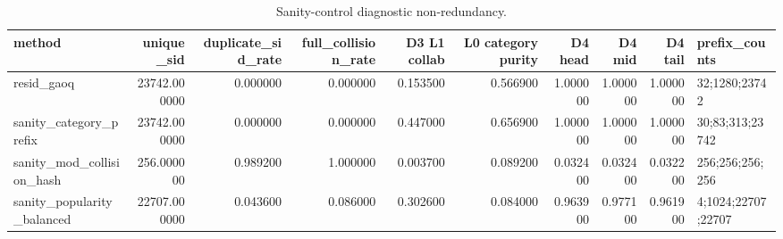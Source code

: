 \begin{table}
\caption{Sanity-control diagnostic non-redundancy.}
\label{tab:sanity-controls}
\begin{tabular}{lrrrrrrrrl}
\toprule
method & unique\_sid & duplicate\_sid\_rate & full\_collision\_rate & D3 L1 collab & L0 category purity & D4 head & D4 mid & D4 tail & prefix\_counts \\
\midrule
resid\_gaoq & 23742.000000 & 0.000000 & 0.000000 & 0.153500 & 0.566900 & 1.000000 & 1.000000 & 1.000000 & 32;1280;23742 \\
sanity\_category\_prefix & 23742.000000 & 0.000000 & 0.000000 & 0.447000 & 0.656900 & 1.000000 & 1.000000 & 1.000000 & 30;83;313;23742 \\
sanity\_mod\_collision\_hash & 256.000000 & 0.989200 & 1.000000 & 0.003700 & 0.089200 & 0.032400 & 0.032400 & 0.032200 & 256;256;256;256 \\
sanity\_popularity\_balanced & 22707.000000 & 0.043600 & 0.086000 & 0.302600 & 0.084000 & 0.963900 & 0.977100 & 0.961900 & 4;1024;22707;22707 \\
\bottomrule
\end{tabular}
\end{table}

